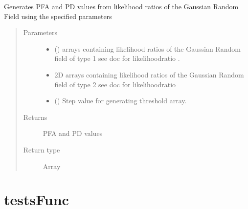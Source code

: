 \documentclass[letterpaper,10pt,english]{sphinxmanual}
\begin{document}
\begin{fulllineitems}
\label{\detokenize{rocGen:rocGen.LikelihoodROC}}
\sphinxAtStartPar
Generates PFA and PD values from likelihood ratios of the Gaussian Random Field using the specified parameters
\begin{quote}\begin{description}
\item[{Parameters}] \leavevmode\begin{itemize}
\item {} 
\sphinxAtStartPar
{} () \textendash{} arrays containing likelihood ratios of the Gaussian Random field of type 1 see doc for likelihoodratio .

\item {} 
\sphinxAtStartPar
{} \textendash{} 2\sphinxhyphen{}D arrays containing likelihood ratios of the Gaussian Random field of type 2 see doc for likelihoodratio

\item {} 
\sphinxAtStartPar
{} () \textendash{} Step value for generating threshold array.

\end{itemize}

\item[{Returns}] \leavevmode
\sphinxAtStartPar
PFA and PD values

\item[{Return type}] \leavevmode
\sphinxAtStartPar
Array

\end{description}\end{quote}

\end{fulllineitems}



\chapter{testsFunc}
\label{\detokenize{testsFunc:testsfunc}}\label{\detokenize{testsFunc:id1}}\label{\detokenize{testsFunc::doc}}\label{\detokenize{testsFunc:module-testsFunc}}
\end{document}
